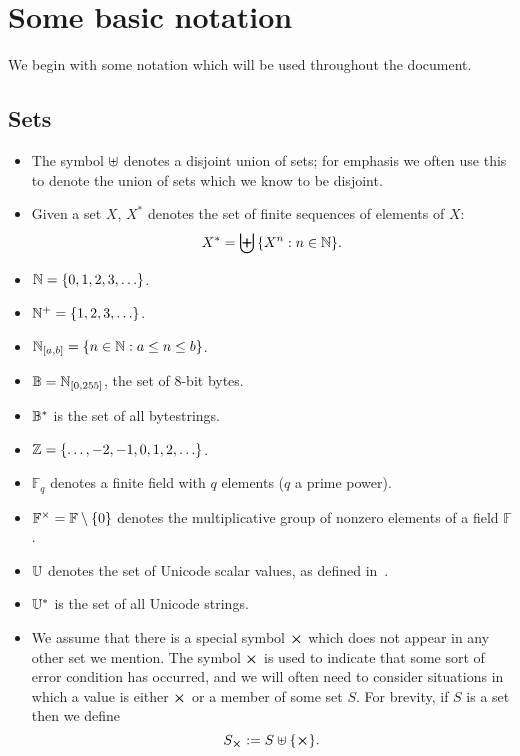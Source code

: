 \section{Some basic notation}
We begin with some notation which will be used throughout the document.

\subsection{Sets}
\label{sec:notation-sets}
\begin{itemize}
  \item The symbol $\uplus$ denotes a disjoint union of sets;  for emphasis we often use this
    to denote the union of sets which we know to be disjoint.
  \item Given a set $X$, $X^*$ denotes the set of finite sequences of elements of $X$:
    $$
    X^*= \biguplus{\{X^n: n \in \mathbb{N}\}}.
    $$
  \item $\mathbb{N} = \{0,1,2,3,\ldots\}$.
  \item $\mathbb{N}^{+} = \{1,2,3,\ldots\}$.
  \item $\mathbb{N}_{[a,b]} = \{n \in \mathbb{N}: a \leq n \leq b\}$.
  \item $\mathbb{B} = \mathbb{N}_{[0,255]}$, the set of 8-bit bytes.
  \item $\mathbb{B}^*$ is the set of all bytestrings.
  \item $\mathbb{Z} = \{\ldots, -2, -1, 0, 1, 2, \ldots\}$.
  \item $\mathbb{F}_q$ denotes a finite field with $q$ elements ($q$ a prime power).
  \item $\mathbb{F}^{\times} = \mathbb{F}\setminus\{0\}$ denotes the multiplicative group of nonzero elements of a field $\mathbb{F}$.
  \item $\mathbb{U}$ denotes the set of Unicode scalar values, as defined in~\cite[Definition D76]{Unicode-standard}.
  \item $\mathbb{U}^*$ is the set of all Unicode strings.
  \item We assume that there is a special symbol $\errorX$ which does not appear
    in any other set we mention.  The symbol $\errorX$ is used to indicate that
    some sort of error condition has occurred, and we will often need to consider
    situations in which a value is either $\errorX$ or a member of some set $S$.
    For brevity, if $S$ is a set then we define
    $$
    \withError{S} := S \disj \{\errorX\}.
    $$
\end{itemize}%
%
%
